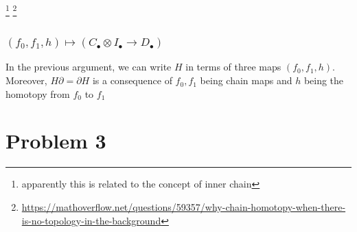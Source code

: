 \documentclass{article}
\begin{document}
\begin{center}
\end{center}

\footnote{apparently this is related to the concept of inner chain} \footnote{\url{https://mathoverflow.net/questions/59357/why-chain-homotopy-when-there-is-no-topology-in-the-background}}


\subsubsection{$(f_0, f_1, h) \mapsto (C_\bullet \otimes I_\bullet \to D_\bullet)$}

In the previous argument, we can write $H$ in terms of three maps $(f_0, f_1, h)$. Moreover, $H \partial = \partial H$ is a consequence of $f_0, f_1$ being chain maps and $h$ being the homotopy from $f_0$ to $f_1$

\section{Problem 3}
\end{document}
